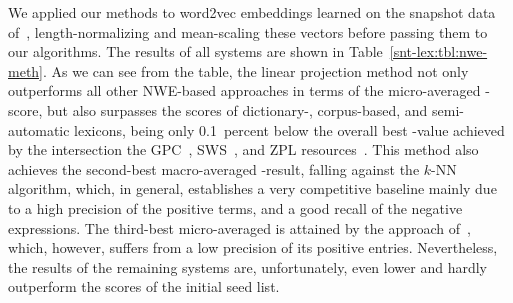 We applied our methods to word2vec embeddings learned on the snapshot
data of~\citet{Scheffler:14}, length-normalizing and mean-scaling
these vectors before passing them to our algorithms.  The results of
all systems are shown in Table~\ref{snt-lex:tbl:nwe-meth}.  As we can
see from the table, the linear projection method not only outperforms
all other NWE-based approaches in terms of the micro-averaged
\F-score, but also surpasses the scores of dictionary-, corpus-based,
and semi-automatic lexicons, being only 0.1~percent below the overall
best \F-value achieved by the intersection the
GPC~\cite{Waltinger:10}, SWS~\cite{Remus:10}, and ZPL
resources~\cite{Clematide:10}.  This method also achieves the
second-best macro-averaged \F-result, falling against the $k$-NN
algorithm, which, in general, establishes a very competitive baseline
mainly due to a high precision of the positive terms, and a good
recall of the negative expressions.  The third-best micro-averaged
\F{} is attained by the approach of~\citet{Tang:14a}, which, however,
suffers from a low precision of its positive entries.  Nevertheless,
the results of the remaining systems are, unfortunately, even lower
and hardly outperform the scores of the initial seed list.


